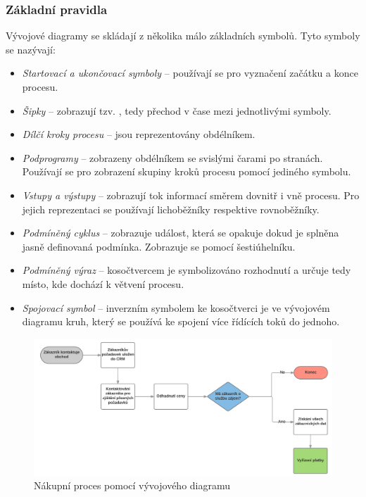 \subsubsection{Základní pravidla}
Vývojové diagramy se skládají z několika málo základních symbolů. Tyto symboly se nazývají: \cite{Chytil2005}

\begin{itemize}
\item \textit{Startovací a ukončovací symboly} – používají se pro vyznačení začátku a konce procesu.
\item \textit{Šipky} – zobrazují tzv. , tedy přechod v čase mezi jednotlivými symboly.
\item \textit{Dílčí kroky procesu} – jsou reprezentovány obdélníkem.
\item \textit{Podprogramy} – zobrazeny obdélníkem se svislými čarami po stranách. Používají se pro zobrazení skupiny kroků procesu pomocí jediného symbolu.
\item \textit{Vstupy a výstupy} – zobrazují tok informací směrem dovnitř i vně procesu. Pro jejich reprezentaci se používají lichoběžníky respektive rovnoběžníky.
\item \textit{Podmíněný cyklus} – zobrazuje událost, která se opakuje dokud je splněna jasně definovaná podmínka. Zobrazuje se pomocí šestiúhelníku.
\item \textit{Podmíněný výraz} – kosočtvercem je symbolizováno rozhodnutí a určuje tedy místo, kde dochází k větvení procesu.
\item \textit{Spojovací symbol} – inverzním symbolem ke kosočtverci je ve vývojovém diagramu kruh, který se používá ke spojení více řídících toků do jednoho.
\end{itemize}

\begin{figure}[H]\centering
\includegraphics[width=1.0\textwidth]{obrazky/flowchart}
\caption{Nákupní proces pomocí vývojového diagramu}
\label{fig:Flowchart}
\end{figure}

